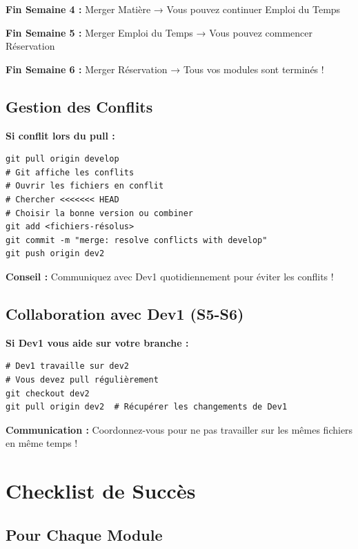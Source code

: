 \documentclass[11pt,a4paper]{article}
\begin{document}
\textbf{Fin Semaine 4 :} Merger Matière → Vous pouvez continuer Emploi du Temps

\textbf{Fin Semaine 5 :} Merger Emploi du Temps → Vous pouvez commencer Réservation

\textbf{Fin Semaine 6 :} Merger Réservation → Tous vos modules sont terminés !

\subsection{Gestion des Conflits}

\textbf{Si conflit lors du pull :}
\begin{verbatim}
git pull origin develop
# Git affiche les conflits
# Ouvrir les fichiers en conflit
# Chercher <<<<<<< HEAD
# Choisir la bonne version ou combiner
git add <fichiers-résolus>
git commit -m "merge: resolve conflicts with develop"
git push origin dev2
\end{verbatim}

\textbf{Conseil :} Communiquez avec Dev1 quotidiennement pour éviter les conflits !

\subsection{Collaboration avec Dev1 (S5-S6)}

\textbf{Si Dev1 vous aide sur votre branche :}
\begin{verbatim}
# Dev1 travaille sur dev2
# Vous devez pull régulièrement
git checkout dev2
git pull origin dev2  # Récupérer les changements de Dev1
\end{verbatim}

\textbf{Communication :} Coordonnez-vous pour ne pas travailler sur les mêmes fichiers en même temps !

\newpage

\section{Checklist de Succès}

\subsection{Pour Chaque Module}
\end{document}
